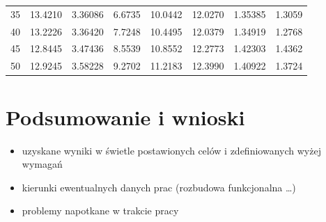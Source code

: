 \documentclass[a4paper,twoside,12pt]{book}
\begin{document}
\begin{table}
\begin{tabular}{rrrrrrrr}
	      35 & 13.4210 & 3.36086 &       6.6735 &    10.0442 &    12.0270 & 1.35385 &                       1.3059 \\
	      40 & 13.2226 & 3.36420 &       7.7248 &    10.4495 &    12.0379 & 1.34919 &                       1.2768 \\
	      45 & 12.8445 & 3.47436 &       8.5539 &    10.8552 &    12.2773 & 1.42303 &                       1.4362 \\
	      50 & 12.9245 & 3.58228 &       9.2702 &    11.2183 &    12.3990 & 1.40922 &                       1.3724 \\
\bottomrule
\end{tabular}
\end{table}  



\chapter{Podsumowanie i wnioski}
\begin{itemize}
\item uzyskane wyniki w świetle postawionych celów i zdefiniowanych wyżej wymagań
\item kierunki ewentualnych danych prac (rozbudowa funkcjonalna …)
\item problemy napotkane w trakcie pracy
\end{itemize}



\backmatter

\cleardoublepage
{}
\printbibliography           %
\end{document}
